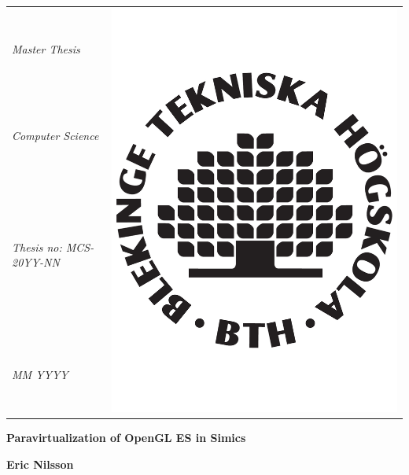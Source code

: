 {\pagestyle{empty}
\changepage{5cm}{1cm}{-0.5cm}{-0.5cm}{}{-2cm}{}{}{}
\noindent%
{\small
\begin{tabular}{p{} p{}}
\textit{Master Thesis}&\multirow{4}{*}{\includegraphics[trim = 3mm 0mm 3mm 4.7cm, clip, width=\logossize]{../dv2524-encl/bthnotext}}\\ %
\textit{Computer Science}\\
\textit{Thesis no: MCS-20YY-NN}\\ %
\textit{MM YYYY}\\ %
\end{tabular}}

\begin{center}
\par\vspace {7cm}
{\Huge\textbf{Paravirtualization of OpenGL ES in Simics}} %
\par\vspace {0.5cm}
{\Large\textbf{}} %
\par\vspace {3cm}
{\Large\textbf{Eric Nilsson}}
\par\vspace {7cm}
\end{center}

}
